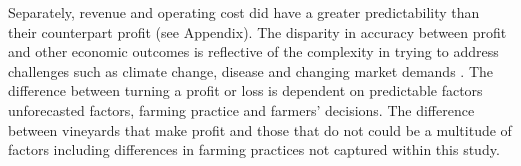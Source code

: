 \documentclass[review,12pt,authoryear]{elsarticle}
\begin{document}
\begin{linenumbers}







Separately, revenue and operating cost did have a greater predictability than their counterpart profit (see Appendix). The disparity in accuracy between profit and other economic outcomes is reflective of the complexity in trying to address challenges such as climate change, disease and changing market demands \citep{wineaustraliaNationalVintageReport2020,wineaustraliaNationalVintageReport2021,wineaustraliaNationalVintageReport2022}. The difference between turning a profit or loss is dependent on predictable factors unforecasted factors, farming practice and farmers' decisions. The difference between vineyards that make profit and those that do not could be a multitude of factors including differences in farming practices not captured within this study.
\iffalse




\end{linenumbers}
\end{document}
